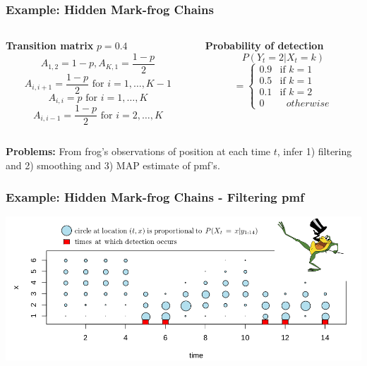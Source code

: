 \documentclass[xcolor=dvipsnames, compress]{beamer}
\begin{document}
\begin{frame}
\frametitle{Example: Hidden Mark-frog Chains}
\begin{columns}
	\begin{column}{0.5\textwidth}
	\textbf{Transition matrix}
	$p=0.4$
	$$A_{1,2} = 1-p, A_{K,1} = \frac{1-p}{2}$$
	$$ A_{i,i+1} = \frac{1-p}{2} \mbox{ for } i=1,\ldots, K-1$$
	$$ A_{i,i} = p \mbox{ for } i=1,\ldots, K$$
	$$ A_{i,i-1} = \frac{1-p}{2} \mbox{ for } i=2,\ldots, K$$
	\end{column}
	\begin{column}{0.5\textwidth}  %
	\textbf{Probability of detection}
	$$P(Y_t=2|X_t=k) $$ 
	$$=\begin{cases} 0.9 &\mbox{if } k=1 \\
	0.5 & \mbox{if } k=1 \\
	0.1 & \mbox{if } k=2 \\
	0 & \mbox{ } otherwise
	\end{cases}$$	
		
	\end{column}
\end{columns}

\vspace{0.5cm}

\textbf{Problems:} From frog’s observations of position at each time $t$, infer 1) filtering and 2) smoothing and 3) MAP estimate of pmf's.

\end{frame}


\begin{frame}
\frametitle{Example: Hidden Mark-frog Chains - Filtering pmf}
\begin{center}
	\includegraphics[width=1.01\textwidth]{images/frog_filtering.png}
\end{center}
\end{frame}


%
%
\end{document}
